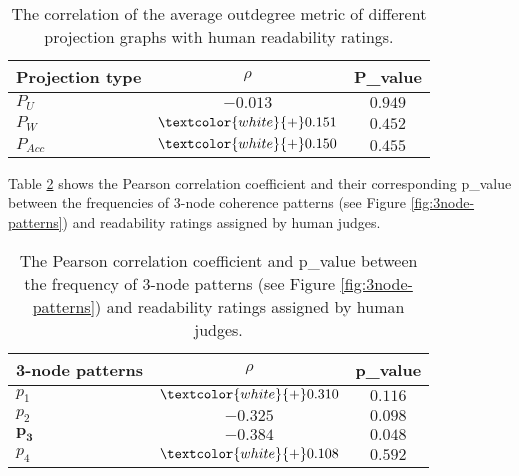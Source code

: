 \begin{table}[!ht]
	\begin{center}
		\begin{tabular}{lcc}
			\toprule
 			\textbf{Projection type}& $\rho$  & \textbf{P\_value}\\
 			\midrule
			$P_U$ 				& $-0.013$ 						& $0.949$ \\
			$P_W$ 				& $\textcolor{white}{+}0.151$  	& $0.452$ \\
			$P_{Acc}$ 			& $\textcolor{white}{+}0.150$ 	& $0.455$ \\
			\bottomrule
		\end{tabular}
	\end{center}
	\caption{The correlation of the average outdegree metric of different projection graphs with human readability ratings.}
 	\label{tab:correlation-outdegree}
\end{table}


Table \ref{tab:correlation-3node} shows the Pearson correlation coefficient and their corresponding p\_value between the frequencies of 3-node coherence patterns (see Figure \ref{fig:3node-patterns}) and readability ratings assigned by human judges. 

\begin{table}[!ht]
	\begin{center}
		\begin{tabular}{lcc}
		\toprule
  	 	\textbf{3-node patterns} & $\rho$ 		& \textbf{p\_value}	 \\
  	 	\midrule
 		$p_1$ 			& $\textcolor{white}{+}0.310$ & $0.116$ 		\\
 		$p_2$ 			& $-0.325$ 				      & $0.098$ 		\\
		$\mathbf{p_3}$ 	& $\mathbf{-0.384}$ 		  & $\mathbf{0.048}$\\
 		$p_4$ 			& $\textcolor{white}{+}0.108$ & $0.592$			\\
 		\bottomrule
		\end{tabular}
	\end{center}
	\caption{The Pearson correlation coefficient and p\_value between the frequency of 3-node patterns (see Figure \ref{fig:3node-patterns}) and readability ratings assigned by human judges.} 
 	\label{tab:correlation-3node}
\end{table}

